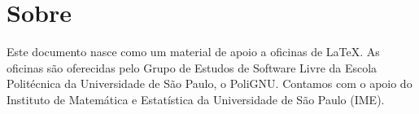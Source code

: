 \section{Sobre}

Este documento nasce como um material de apoio a oficinas de
\LaTeX. As oficinas são oferecidas pelo Grupo de Estudos de Software
Livre da Escola Politécnica da Universidade de São Paulo, o PoliGNU.
Contamos com o apoio do Instituto de Matemática e Estatística da
Universidade de São Paulo (IME).
